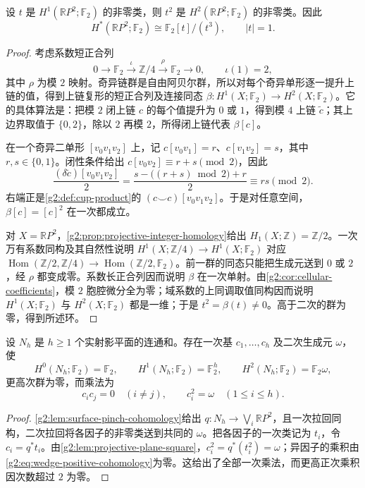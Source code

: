 \begin{lemma}\label{g2:lem:projective-plane-square}
	设 \(t\) 是 \(H^1(\mathbb RP^2;\mathbb F_2)\) 的非零类，则 \(t^2\) 是 \(H^2(\mathbb RP^2;\mathbb F_2)\) 的非零类。因此
	\[
		H^*(\mathbb RP^2;\mathbb F_2)\cong\mathbb F_2[t]/(t^3),\qquad |t|=1.
	\]
\end{lemma}
\begin{proof}
	考虑系数短正合列
	\[
		0\longrightarrow\mathbb F_2\xrightarrow{\ \iota\ }\mathbb Z/4\xrightarrow{\ \rho\ }\mathbb F_2\longrightarrow0,
		\qquad\iota(1)=2,
	\]
	其中 \(\rho\) 为模 \(2\) 映射。奇异链群是自由阿贝尔群，所以对每个奇异单形逐一提升上链的值，得到上链复形的短正合列及连接同态 \(\beta:H^1(X;\mathbb F_2)\to H^2(X;\mathbb F_2)\)。它的具体算法是：把模 \(2\) 闭上链 \(c\) 的每个值提升为 \(0\) 或 \(1\)，得到模 \(4\) 上链 \(\widetilde c\)；其上边界取值于 \(\{0,2\}\)，除以 \(2\) 再模 \(2\)，所得闭上链代表 \(\beta[c]\)。

	在一个奇异二单形 \([v_0v_1v_2]\) 上，记 \(c[v_0v_1]=r\)、\(c[v_1v_2]=s\)，其中 \(r,s\in\{0,1\}\)。闭性条件给出 \(c[v_0v_2]\equiv r+s\pmod2\)，因此
	\[
		\frac{(\delta\widetilde c)[v_0v_1v_2]}2
		=\frac{s-\bigl((r+s)\bmod2\bigr)+r}{2}
		\equiv rs\pmod2.
	\]
	右端正是\cref{g2:def:cup-product}的 \((c\smile c)[v_0v_1v_2]\)。于是对任意空间，\(\beta[c]=[c]^2\) 在一次都成立。

	对 \(X=\mathbb RP^2\)，\cref{g2:prop:projective-integer-homology}给出 \(H_1(X;\mathbb Z)=\mathbb Z/2\)。一次万有系数同构及其自然性说明 \(H^1(X;\mathbb Z/4)\to H^1(X;\mathbb F_2)\) 对应 \(\operatorname{Hom}(\mathbb Z/2,\mathbb Z/4)\to\operatorname{Hom}(\mathbb Z/2,\mathbb F_2)\)。前一群的同态只能把生成元送到 \(0\) 或 \(2\)，经 \(\rho\) 都变成零。系数长正合列因而说明 \(\beta\) 在一次单射。由\cref{g2:cor:cellular-coefficients}，模 \(2\) 胞腔微分全为零；域系数的上同调取值同构因而说明 \(H^1(X;\mathbb F_2)\) 与 \(H^2(X;\mathbb F_2)\) 都是一维；于是 \(t^2=\beta(t)\ne0\)。高于二次的群为零，得到所述环。
\end{proof}

\begin{proposition}\label{g2:prop:nonorientable-surface-ring}
	设 \(N_h\) 是 \(h\geq1\) 个实射影平面的连通和。存在一次基 \(c_1,\ldots,c_h\) 及二次生成元 \(\omega\)，使
	\[
		H^0(N_h;\mathbb F_2)=\mathbb F_2,\qquad
		H^1(N_h;\mathbb F_2)=\mathbb F_2^h,\qquad
		H^2(N_h;\mathbb F_2)=\mathbb F_2\omega,
	\]
	更高次群为零，而乘法为
	\begin{equation}\label{g2:eq:nonorientable-surface-products}
		c_i c_j=0\quad(i\ne j),\qquad c_i^2=\omega\quad(1\leq i\leq h).
	\end{equation}
\end{proposition}
\begin{proof}
	\cref{g2:lem:surface-pinch-cohomology}给出 \(q:N_h\to\bigvee_i\mathbb RP^2\)，且一次拉回同构，二次拉回将各因子的非零类送到共同的 \(\omega\)。把各因子的一次类记为 \(t_i\)，令 \(c_i=q^*t_i\)。由\cref{g2:lem:projective-plane-square}，\(c_i^2=q^*(t_i^2)=\omega\)；异因子的乘积由\eqref{g2:eq:wedge-positive-cohomology}为零。这给出了全部一次乘法，而更高正次乘积因次数超过 \(2\) 为零。
\end{proof}

